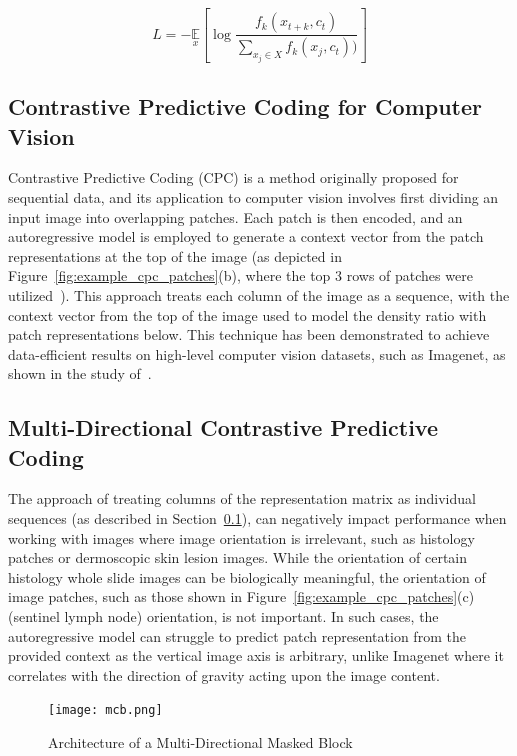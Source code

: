 \begin{equation}
	L=-\underset{x}{\mathbb{E}}\left[\log\frac{f_k(x_{t+k},c_t)}{\sum_{x_j\in X}f_k(x_j,c_t))}\right]
	\label{eq:InfoNCE}
\end{equation} 

\subsection{Contrastive Predictive Coding for Computer Vision}
\label{subsec:unsupervised_cpc_for_vision}
Contrastive Predictive Coding (CPC) is a method originally proposed for sequential data, and its application to computer vision involves first dividing an input image into overlapping patches. Each patch is then encoded, and an autoregressive model is employed to generate a context vector from the patch representations at the top of the image (as depicted in Figure~\ref{fig:example_cpc_patches}(b), where the top 3 rows of patches were utilized~\citep{oord2018representation}). This approach treats each column of the image as a sequence, with the context vector from the top of the image used to model the density ratio with patch representations below. This technique has been demonstrated to achieve data-efficient results on high-level computer vision datasets, such as Imagenet, as shown in the study of~\cite{deng2009imagenet}.

\subsection{Multi-Directional Contrastive Predictive Coding}
\label{subsec:unsupervised_mdcpc}
The approach of treating columns of the representation matrix as individual sequences (as described in Section~\ref{subsec:unsupervised_cpc_for_vision}), can negatively impact performance when working with images where image orientation is irrelevant, such as histology patches or dermoscopic skin lesion images. While the orientation of certain histology whole slide images can be biologically meaningful, the orientation of image patches, such as those shown in Figure~\ref{fig:example_cpc_patches}(c) (sentinel lymph node) orientation, is not important. In such cases, the autoregressive model can struggle to predict patch representation from the provided context as the vertical image axis is arbitrary, unlike Imagenet where it correlates with the direction of gravity acting upon the image content.

\begin{figure}
	\centering
	\texttt{[image: mcb.png]}
	\caption{Architecture of a Multi-Directional Masked Block}
	\label{fig:multi-directional_masked_block}
\end{figure}

